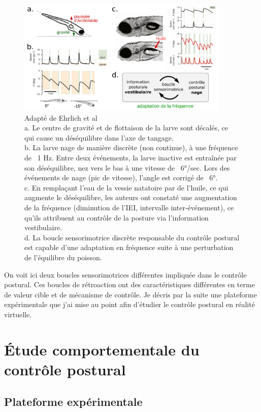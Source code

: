 \begin{figure}
\centering
\includegraphics[width=0.9\textwidth]{./files/schoppik_movement-initiation.svg.png}
\caption{Adapté de Ehrlich et al \cite{ehrlich_control_2017}
\\
a. Le centre de gravité et de flottaison de la larve sont décalés, ce qui cause un déséquilibre dans l'axe de tangage.
\\
b. La larve nage de manière discrète (non continue), à une fréquence de ~1 Hz. Entre deux événements, la larve inactive est entraînée par son déséquilibre, nez vers le bas à une vitesse de ~6°/sec. Lors des événements de nage (pic de vitesse), l'angle est corrigé de ~6°.
\\
c. En remplaçant l'eau de la vessie natatoire par de l'huile, ce qui augmente le déséquilibre, les auteurs ont constaté une augmentation de la fréquence (diminution de l'IEI, intervalle inter-événement), ce qu'ils attribuent au contrôle de la posture via l'information vestibulaire.
\\
d. La boucle sensorimotrice discrète responsable du contrôle postural est capable d'une adaptation en fréquence suite à une perturbation de l'équilibre du poisson.}
\end{figure}

On voit ici deux boucles sensorimotrices différentes impliquée dans le contrôle postural. Ces boucles de rétroaction ont des caractéristiques différentes en terme de valeur cible et de mécanisme de contrôle. Je décris par la suite une plateforme expérimentale que j'ai mise au point afin d'étudier le contrôle postural en réalité virtuelle.

\section{Étude comportementale du contrôle postural}

\subsection{Plateforme expérimentale}

